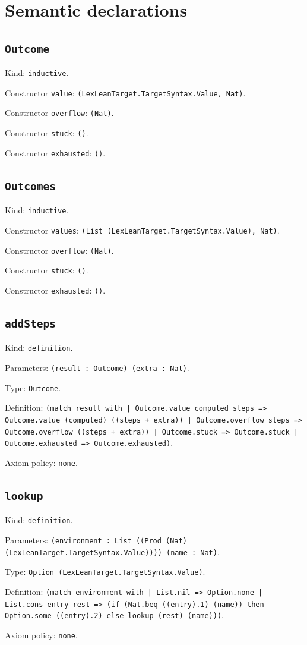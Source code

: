 \documentclass[11pt]{article}
\begin{document}
\section*{Semantic declarations}
\subsection*{\texttt{Outcome}}
\noindent Kind: \texttt{inductive}.\par
\noindent Constructor \texttt{value}: \texttt{(LexLeanTarget.TargetSyntax.Value, Nat)}.\par
\noindent Constructor \texttt{overflow}: \texttt{(Nat)}.\par
\noindent Constructor \texttt{stuck}: \texttt{()}.\par
\noindent Constructor \texttt{exhausted}: \texttt{()}.\par
\subsection*{\texttt{Outcomes}}
\noindent Kind: \texttt{inductive}.\par
\noindent Constructor \texttt{values}: \texttt{(List (LexLeanTarget.TargetSyntax.Value), Nat)}.\par
\noindent Constructor \texttt{overflow}: \texttt{(Nat)}.\par
\noindent Constructor \texttt{stuck}: \texttt{()}.\par
\noindent Constructor \texttt{exhausted}: \texttt{()}.\par
\subsection*{\texttt{addSteps}}
\noindent Kind: \texttt{definition}.\par
\noindent Parameters: \texttt{(result : Outcome) (extra : Nat)}.\par
\noindent Type: \texttt{Outcome}.\par
\noindent Definition: \texttt{(match result with | Outcome.value computed steps => Outcome.value (computed) ((steps + extra)) | Outcome.overflow steps => Outcome.overflow ((steps + extra)) | Outcome.stuck => Outcome.stuck | Outcome.exhausted => Outcome.exhausted)}.\par
\noindent Axiom policy: \texttt{none}.\par
\subsection*{\texttt{lookup}}
\noindent Kind: \texttt{definition}.\par
\noindent Parameters: \texttt{(environment : List ((Prod (Nat) (LexLeanTarget.TargetSyntax.Value)))) (name : Nat)}.\par
\noindent Type: \texttt{Option (LexLeanTarget.TargetSyntax.Value)}.\par
\noindent Definition: \texttt{(match environment with | List.nil => Option.none | List.cons entry rest => (if (Nat.beq ((entry).1) (name)) then Option.some ((entry).2) else lookup (rest) (name)))}.\par
\noindent Axiom policy: \texttt{none}.\par
\end{document}
